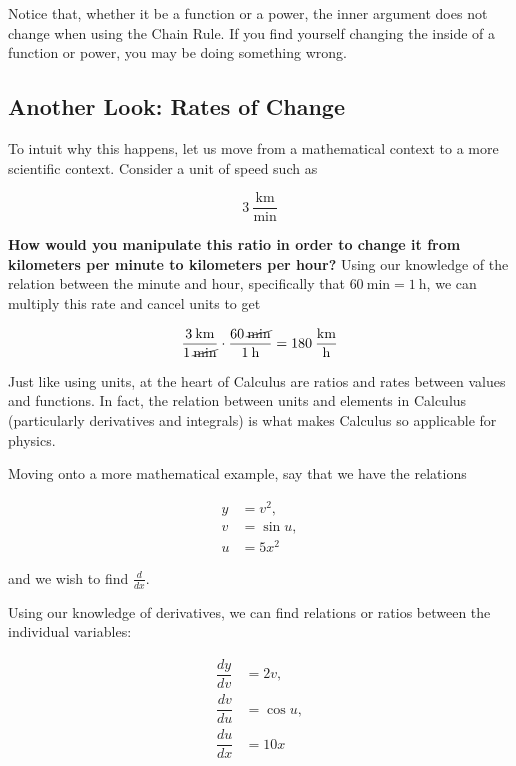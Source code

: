 \begin{tip}
    Notice that, whether it be a function or a power, the inner argument does not change when using the Chain Rule. If you find yourself changing the inside of a function or power, you may be doing something wrong.
\end{tip}

\subsection{Another Look: Rates of Change}

To intuit why this happens, let us move from a mathematical context to a more scientific context. Consider a unit of speed such as

\[ \num{3} \> \dfrac{\si{\kilo\meter}}{\si{\minute}} \]

\textbf{How would you manipulate this ratio in order to change it from kilometers per minute to kilometers per hour?} Using our knowledge of the relation between the minute and hour, specifically that \( \SI{60}{\minute} = \SI{1}{\hour} \), we can multiply this rate and cancel units to get

\[ \dfrac{\num{3} \> \si{\kilo\meter}}{\num{1} \> \cancel{\si{\minute}}} \cdot \dfrac{\num{60} \> \cancel{\si{\minute}}}{\num{1} \> \si{\hour}} = \num{180} \> \dfrac{\si{\kilo\meter}}{\si{\hour}} \]

Just like using units, at the heart of Calculus are ratios and rates between values and functions. In fact, the relation between units and elements in Calculus (particularly derivatives and integrals) is what makes Calculus so applicable for physics.

Moving onto a more mathematical example, say that we have the relations

\begin{align*}
    y &= v^2, \\
    v &= \sin{u}, \\
    u &= 5x^2
\end{align*}

and we wish to find \( \frac{d}{dx} \).

Using our knowledge of derivatives, we can find relations or ratios between the individual variables:

\begin{align*}
    \dfrac{dy}{dv} &= 2v, \\
    \dfrac{dv}{du} &= \cos{u}, \\
    \dfrac{du}{dx} &= 10x
\end{align*}

